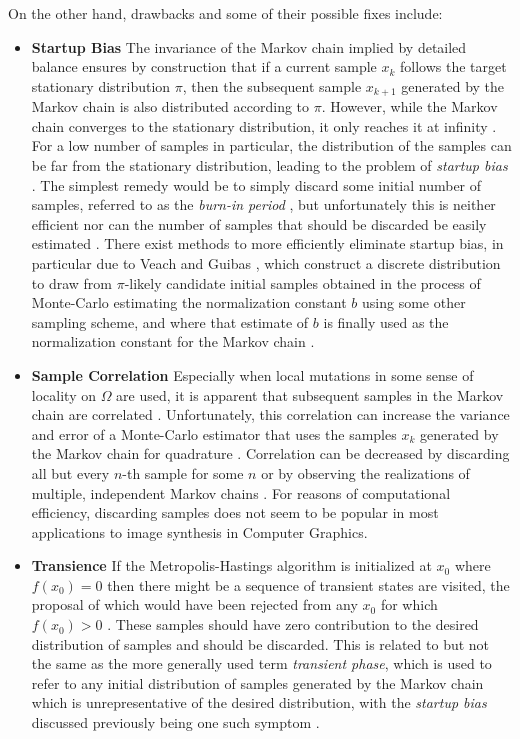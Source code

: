 \documentclass[oneside, a4paper]{article}
\begin{document}
On the other hand, drawbacks and some of their possible fixes include:
\begin{itemize}
  \item \textbf{Startup Bias} The invariance of the Markov chain implied by detailed balance ensures by construction that if a current sample $x_k$ follows the target stationary distribution $\pi$, then the subsequent sample $x_{k+1}$ generated by the Markov chain is also distributed according to $\pi$. However, while the Markov chain converges to the stationary distribution, it only reaches it at infinity \autocite{survey}. For a low number of samples in particular, the distribution of the samples can be far from the stationary distribution, leading to the problem of \textit{startup bias} \autocite{pbrt}. The simplest remedy would be to simply discard some initial number of samples, referred to as the \textit{burn-in period} \autocite{burn-in}, but unfortunately this is neither efficient nor can the number of samples that should be discarded be easily estimated \autocite{survey}. There exist methods to more efficiently eliminate startup bias, in particular due to Veach and Guibas \autocites{veach-guibas-mlt}{survey}, which construct a discrete distribution to draw from $\pi$-likely candidate initial samples obtained in the process of Monte-Carlo estimating the normalization constant $b$ using some other sampling scheme, and where that estimate of $b$ is finally used as the normalization constant for the Markov chain \autocite{survey}.
  \item \textbf{Sample Correlation} Especially when local mutations in some sense of locality on $\Omega$ are used, it is apparent that subsequent samples in the Markov chain are correlated \autocite{bayesian-gibbs-mcmc}. Unfortunately, this correlation can increase the variance and error of a Monte-Carlo estimator that uses the samples $x_k$ generated by the Markov chain for quadrature \autocite{pssmlt}. Correlation can be decreased by discarding all but every $n$-th sample for some $n$ or by observing the realizations of multiple, independent Markov chains \autocite{bayesian-gibbs-mcmc}. For reasons of computational efficiency, discarding samples does not seem to be popular in most applications to image synthesis in Computer Graphics.
  \item \textbf{Transience} If the Metropolis-Hastings algorithm is initialized at $x_0$ where $f(x_0)=0$ then there might be a sequence of transient states are visited, the proposal of which would have been rejected from any $x_0$ for which $f(x_0)>0$ \autocite{transient-recurrent}. These samples should have zero contribution to the desired distribution of samples and should be discarded. This is related to but not the same as the more generally used term \textit{transient phase}, which is used to refer to any initial distribution of samples generated by the Markov chain which is unrepresentative of the desired distribution, with the \textit{startup bias} discussed previously being one such symptom \autocite{burn-in}.

\end{itemize}
\end{document}
